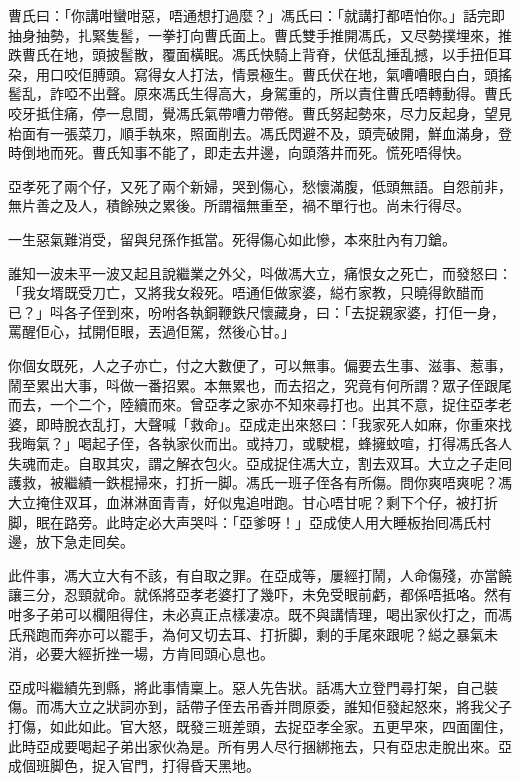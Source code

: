 \documentclass[a5paper, 12pt, openany]{book} %
\begin{document}
	曹氏曰：「你講咁蠻咁惡，唔通想打過麼？」馮氏曰：「就講打都唔怕你。」話完即抽身抽勢，扎緊隻䯻，一拳打向曹氏面上。曹氏雙手推開馮氏，又尽勢撲埋來，推跌曹氏在地，頭披䯻散，覆面橫眠。馮氏快騎上背脊，伏低乱捶乱撼，以手扭佢耳朶，用口咬佢膊頭。寫得女人打法，情景極生。曹氏伏在地，氣嘈嘈眼白白，頭搖䯻乱，詐啞不出聲。原來馮氏生得高大，身駕重的，所以責住曹氏唔轉動得。曹氏咬牙抵住痛，停一息間，覺馮氏氣帶嘈力帶倦。曹氏努起勢來，尽力反起身，望見枱面有一張菜刀，順手執來，照面削去。馮氏閃避不及，頭壳破開，鮮血滿身，登時倒地而死。曹氏知事不能了，即走去井邊，向頭落井而死。慌死唔得快。

	亞孝死了兩个仔，又死了兩个新婦，哭到傷心，愁懷滿腹，低頭無語。自怨前非，無片善之及人，積餘殃之累後。所謂福無重至，禍不單行也。尚未行得尽。

	一生惡氣難消受，留與兒孫作抵當。死得傷心如此慘，本來肚內有刀鎗。

	誰知一波未平一波又起且說繼業之外父，呌做馮大立，痛恨女之死亡，而發怒曰：「我女壻既受刀亡，又將我女殺死。唔通佢做家婆，縂冇家教，只曉得飲醋而已？」呌各子侄到來，吩咐各執銅鞭鉄尺懷藏身，曰：「去捉親家婆，打佢一身，罵醒佢心，拭開佢眼，丟過佢駕，然後心甘。」

	你個女既死，人之子亦亡，付之大數便了，可以無事。偏要去生事、滋事、惹事，鬧至累出大事，呌做一番招累。本無累也，而去招之，究竟有何所謂？眾子侄跟尾而去，一个二个，陸續而來。曾亞孝之家亦不知來尋打也。出其不意，捉住亞孝老婆，即時脫衣乱打，大聲喊「救命」。亞成走出來怒曰：「我家死人如麻，你重來找我晦氣？」喝起子侄，各執家伙而出。或持刀，或駛棍，蜂擁蚊喧，打得馮氏各人失魂而走。自取其灾，謂之解衣包火。亞成捉住馮大立，割去双耳。大立之子走囘護救，被繼績一鉄棍掃來，打折一脚。馮氏一班子侄各有所傷。問你爽唔爽呢？馮大立掩住双耳，血淋淋面青青，好似鬼追咁跑。甘心唔甘呢？剩下个仔，被打折脚，眠在路旁。此時定必大声哭呌：「亞爹呀！」亞成使人用大睡板抬囘馮氏村邊，放下急走囘矣。

	此件事，馮大立大有不該，有自取之罪。在亞成等，屢經打鬧，人命傷殘，亦當饒讓三分，忍頸就命。就係將亞孝老婆打了幾吓，未免受眼前虧，都係唔抵咯。然有咁多子弟可以欄阻得住，未必真正点樣凄凉。既不與講情理，喝出家伙打之，而馮氏飛跑而奔亦可以罷手，為何又切去耳、打折脚，剩的手尾來跟呢？縂之暴氣未消，必要大經折挫一場，方肯囘頭心息也。

	亞成呌繼績先到縣，將此事情稟上。惡人先告狀。話馮大立登門尋打架，自己裝傷。而馮大立之狀詞亦到，話帶子侄去吊香并問原委，誰知佢發起怒來，將我父子打傷，如此如此。官大怒，既發三班差頭，去捉亞孝全家。五更早來，四面圍住，此時亞成要喝起子弟出家伙為是。所有男人尽行捆綁拖去，只有亞忠走脫出來。亞成個班脚色，捉入官門，打得昏天黑地。
\end{document}
